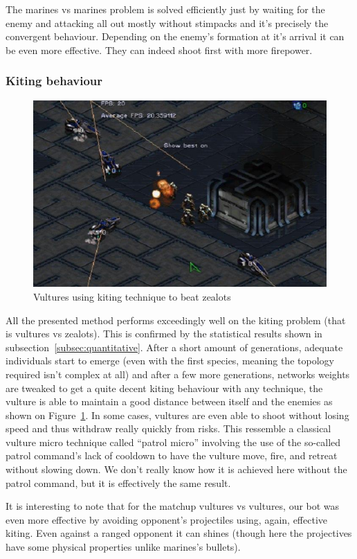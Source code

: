 The marines vs marines problem is solved efficiently just by waiting for the
enemy and attacking all out mostly without stimpacks and it's precisely the convergent behaviour.
Depending on the enemy’s formation at it’s arrival it can be even more effective.
They can indeed shoot first with more firepower.

\subsubsection{Kiting behaviour}

\begin{figure}
    \includegraphics[width=.5\textwidth]{figures/vultures_kiting_screenshot}
    \caption{Vultures using kiting technique to beat zealots}\label{fig:vultures_kiting}
\end{figure}

All the presented method performs exceedingly well on the kiting problem (that is vultures vs zealots).
This is confirmed by the statistical results shown in subsection~\ref{subsec:quantitative}. After a short amount of generations, adequate
individuals start to emerge (even with the first species, meaning the topology required isn’t complex at all)
and after a few more generations, networks weights are tweaked to get a quite decent kiting behaviour with any
technique, the vulture is able to maintain a good distance between itself and the enemies as shown on
Figure~\ref{fig:vultures_kiting}. In some cases, vultures are even able to shoot without
losing speed and thus withdraw really quickly from risks. This ressemble
a classical vulture micro technique called “patrol micro” involving the use of the so-called patrol command's
lack of cooldown to have the vulture move, fire, and retreat without slowing down. We don’t really know how it
is achieved here without the patrol command, but it is effectively the same result.

It is interesting to note that for the matchup vultures vs vultures, our bot was even more effective by avoiding opponent's
projectiles using, again, effective kiting. Even against a ranged opponent it can shines (though here the projectives have
some physical properties unlike marines's bullets).

